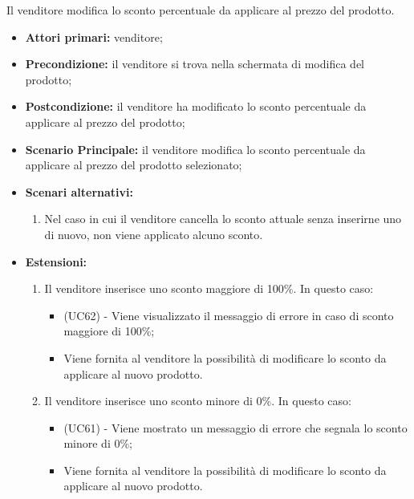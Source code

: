 Il venditore modifica lo sconto percentuale da applicare al prezzo del prodotto.
\begin{itemize}
    \item \textbf{Attori primari:} venditore;
    \item \textbf{Precondizione:} il venditore si trova nella schermata di modifica del prodotto;
    \item \textbf{Postcondizione:} il venditore ha modificato lo sconto percentuale da applicare al prezzo del prodotto;
    \item \textbf{Scenario Principale:} il venditore modifica lo sconto percentuale da applicare al prezzo del prodotto selezionato;
    \item \textbf{Scenari alternativi:}
    \begin{enumerate}[label=\lett]
    	\item Nel caso in cui il venditore cancella lo sconto attuale senza inserirne uno di nuovo, non viene applicato alcuno sconto.
    \end{enumerate}
    \item \textbf{Estensioni:}
    \begin{enumerate}[label=\lett]
    	\item Il venditore inserisce uno sconto maggiore di 100\%. In questo caso:
		\begin{itemize}
			\item (UC62) - Viene visualizzato il messaggio di errore in caso di sconto maggiore di 100\%;
			\item Viene fornita al venditore la possibilità di modificare lo sconto da applicare al nuovo prodotto.
		\end{itemize}
		\item Il venditore inserisce uno sconto minore di 0\%. In questo caso:
		\begin{itemize}
			\item (UC61) - Viene mostrato un messaggio di errore che segnala lo sconto minore di 0\%;
			\item Viene fornita al venditore la possibilità di modificare lo sconto da applicare al nuovo prodotto.
		\end{itemize}
    \end{enumerate}
\end{itemize}

